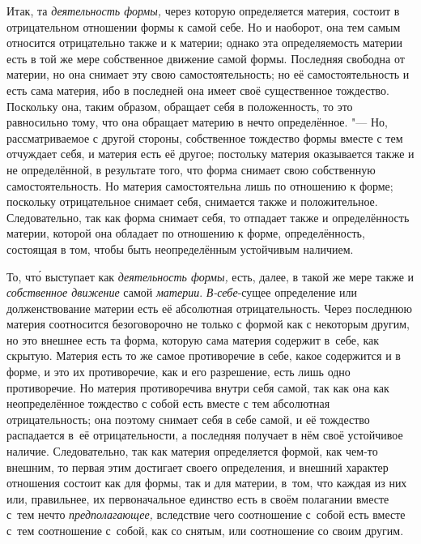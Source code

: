 Итак, та {\em деятельность формы,} через которую определяется материя, состоит
в отрицательном отношении формы к самой себе. Но и наоборот, она тем самым
относится отрицательно также и к материи; однако эта определяемость материи
есть в той же мере собственное движение самой формы. Последняя свободна от
материи, но она снимает эту свою самостоятельность; но её самостоятельность и
есть сама материя, ибо в последней она имеет своё существенное тождество.
Поскольку она, таким образом, обращает себя в положенность, то это равносильно
тому, что она обращает материю в нечто определённое. "--- Но, рассматриваемое с
другой стороны, собственное тождество формы вместе с тем отчуждает себя, и
материя есть её другое; постольку материя оказывается также и не определённой,
в результате того, что форма снимает свою собственную самостоятельность. Но
материя самостоятельна лишь по отношению к форме; поскольку отрицательное
снимает себя, снимается также и положительное. Следовательно, так как форма
снимает себя, то отпадает также и определённость материи, которой она обладает
по отношению к форме, определённость, состоящая в том, чтобы быть
неопределённым устойчивым наличием.

То, чт\'{о} выступает как {\em деятельность формы,} есть, далее, в такой же
мере также и {\em собственное движение} самой {\em материи}. {\em В-себе}-сущее
определение или долженствование материи есть её абсолютная отрицательность.
Через последнюю материя соотносится безоговорочно не только с формой как с
некоторым другим, но это внешнее есть та форма, которую сама материя содержит
в~себе, как скрытую. Материя есть то же самое противоречие в себе, какое
содержится и в форме, и это их противоречие, как и его разрешение, есть лишь
одно противоречие. Но материя противоречива внутри себя самой, так как она как
неопределённое тождество с собой есть вместе с тем абсолютная отрицательность;
она поэтому снимает себя в себе самой, и её тождество распадается в~её
отрицательности, а последняя получает в нём своё устойчивое наличие.
Следовательно, так как материя определяется формой, как чем-то внешним, то
первая этим достигает своего определения, и внешний характер отношения состоит
как для формы, так и для материи, в~том, что каждая из них или, правильнее, их
первоначальное единство есть в своём полагании вместе с~тем нечто
{\em предполагающее,} вследствие чего соотношение с~собой есть вместе с~тем
соотношение с~собой, как со снятым, или соотношение со своим другим.


